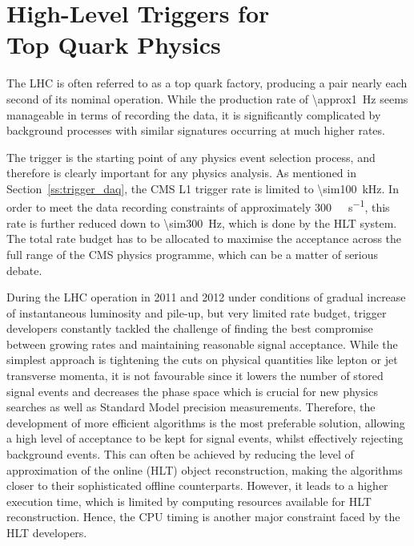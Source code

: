 
\chapter[{High-Level Triggers for Top Quark Physics}]{High-Level Triggers for \\Top Quark Physics}
\label{c:service_work}
\ifpdf
    \graphicspath{{04_Service_work/plots/}}
\else
    \graphicspath{{04_Service_work/plots/EPS/}{04_Service_work/plots/}}
\fi

The LHC is often referred to as a top quark factory, producing a \ttbar pair nearly each second of its nominal
operation. While the production rate of \SI{\approx1}{\Hz} seems manageable in terms of recording the data, it is
significantly complicated by background processes with similar signatures occurring at much higher rates.

The trigger is the starting point of any physics event selection process, and therefore is clearly important for any
physics analysis. As mentioned in Section~\ref{ss:trigger_daq}, the CMS L1 trigger rate is limited to
\SI{\sim100}{\kilo\hertz}. In order to meet the data recording constraints of approximately
\SI{300}{\mega\byte\per\second}, this rate is further reduced down to \SI{\sim300}{\Hz}, which is done by the HLT
system. The total rate budget has to be allocated to maximise the acceptance across the full range of the CMS physics
programme, which can be a matter of serious debate.

During the LHC operation in 2011 and 2012 under conditions of gradual increase of instantaneous luminosity and pile-up,
but very limited rate budget, trigger developers constantly tackled the challenge of finding the best compromise between
growing rates and maintaining reasonable signal acceptance. While the simplest approach is tightening the cuts on
physical quantities like lepton or jet transverse momenta, it is not favourable since it lowers the number of stored
signal events and decreases the phase space which is crucial for new physics searches as well as Standard Model
precision measurements. Therefore, the development of more efficient algorithms is the most preferable solution,
allowing a high level of acceptance to be kept for signal events, whilst effectively rejecting background events. This
can often be achieved by reducing the level of approximation of the online (HLT) object reconstruction, making the
algorithms closer to their sophisticated offline counterparts. However, it leads to a higher execution time, which is
limited by computing resources available for HLT reconstruction. Hence, the CPU timing is another major constraint faced
by the HLT developers.

